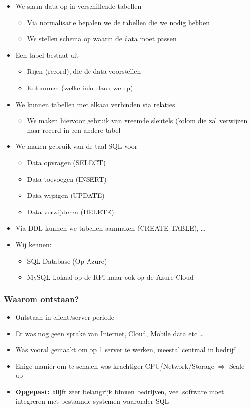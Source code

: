 \documentclass{article}
\newcommand{\bold}[1]{\textbf{#1}}
\begin{document}
\begin{itemize}
    \item We slaan data op in verschillende tabellen
    \begin{itemize}
        \item Via normalisatie bepalen we de tabellen die we nodig hebben
        \item We stellen schema op waarin de data moet passen
    \end{itemize}
    \item Een tabel bestaat uit
    \begin{itemize}
        \item Rijen (record), die de data voorstellen
        \item Kolommen (welke info slaan we op)
    \end{itemize}
    \item We kunnen tabellen met elkaar verbinden via relaties
    \begin{itemize}
        \item We maken hiervoor gebruik van vreemde sleutels (kolom die zal verwijzen naar record in een andere tabel
    \end{itemize}
    \item We maken gebruik van de taal SQL voor
    \begin{itemize}
        \item Data opvragen (SELECT)
        \item Data toevoegen (INSERT)
        \item Data wijzigen (UPDATE)
        \item Data verwijderen (DELETE)
    \end{itemize}
    \item Via DDL kunnen we tabellen aanmaken (CREATE TABLE), \dots
    \item Wij kennen:
    \begin{itemize}
        \item SQL Database (Op Azure)
        \item MySQL Lokaal op de RPi maar ook op de Azure Cloud
    \end{itemize}
\end{itemize}

\subsubsection{Waarom ontstaan?}

\begin{itemize}
    \item Ontstaan in client/server periode
    \item Er was nog geen sprake van Internet, Cloud, Mobile data etc \dots
    \item Was vooral gemaakt om op 1 server te werken, meestal centraal in bedrijf
    \item Enige manier om te schalen was krachtiger CPU/Network/Storage $\Rightarrow$ Scale up
    \item \bold{Opgepast:} blijft zeer belangrijk binnen bedrijven, veel software moet integreren met bestaande systemen waaronder SQL
\end{itemize}
\end{document}
